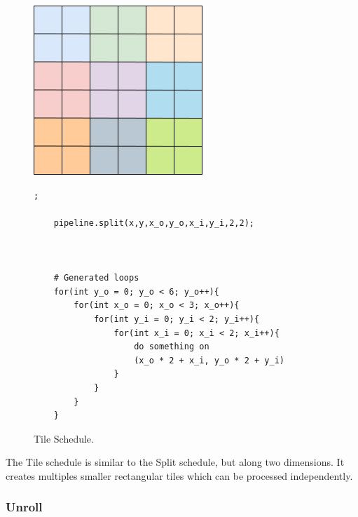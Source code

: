 \begin{figure}[H]

		\begin{minipage}[c]{\EIW}
			\centering
		\includegraphics[width=\textwidth]{Images/Tile.png}
		\end{minipage}
		\begin{minipage}[c]{\ECW}
			\centering
			\begin{lstlisting}[label={code:reorder}];

	pipeline.split(x,y,x_o,y_o,x_i,y_i,2,2);



	# Generated loops
	for(int y_o = 0; y_o < 6; y_o++){
		for(int x_o = 0; x_o < 3; x_o++){
			for(int y_i = 0; y_i < 2; y_i++){
				for(int x_i = 0; x_i < 2; x_i++){
					do something on
					(x_o * 2 + x_i, y_o * 2 + y_i)
				}
			}
		}
	}
\end{lstlisting}
		\end{minipage}
		\caption{Tile Schedule.}
		\label{schedule:tile}
\end{figure}
	The Tile schedule is similar to the Split schedule, but along two dimensions. It creates multiples smaller rectangular tiles which can be processed independently.

	\subsubsection{Unroll}



